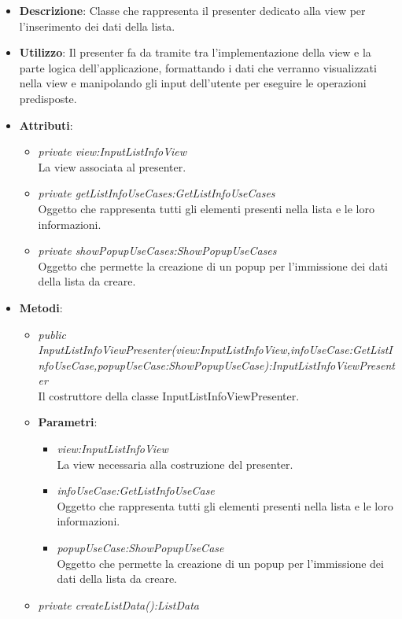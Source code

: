 \begin{itemize}
\item \textbf{Descrizione}: Classe che rappresenta il presenter dedicato alla view per l'inserimento dei dati della lista.
\item \textbf{Utilizzo}: Il presenter fa da tramite tra l'implementazione della view e la parte logica dell'applicazione, formattando i dati che verranno visualizzati nella view e manipolando gli input dell'utente per eseguire le operazioni predisposte.
\item \textbf{Attributi}: 	
	\begin{itemize}
	\item \textit{private view:InputListInfoView}\\
		La view associata al presenter.
	\item \textit{private getListInfoUseCases:GetListInfoUseCases}\\
		Oggetto che rappresenta tutti gli elementi presenti nella lista e le loro informazioni.
	\item \textit{private showPopupUseCases:ShowPopupUseCases}\\
		Oggetto che permette la creazione di un popup per l'immissione dei dati della lista da creare.	
		\end{itemize}
\item \textbf{Metodi}:
	\begin{itemize}	
	\item \textit{public InputListInfoViewPresenter(view:InputListInfoView,infoUseCase:GetListInfoUseCase,popupUseCase:ShowPopupUseCase):InputListInfoViewPresenter}\\
	Il costruttore della classe InputListInfoViewPresenter.
			\item{\textbf{Parametri}: \begin{itemize}
			\item \textit{view:InputListInfoView}\\
			La view necessaria alla costruzione del presenter.
			\item \textit{infoUseCase:GetListInfoUseCase}\\
				Oggetto che rappresenta tutti gli elementi presenti nella lista e le loro informazioni.
			\item \textit{popupUseCase:ShowPopupUseCase}\\
				Oggetto che permette la creazione di un popup per l'immissione dei dati della lista da creare.	
			\end{itemize}}
	\item \textit{private createListData():ListData}\\

\end{itemize}
\end{itemize}
